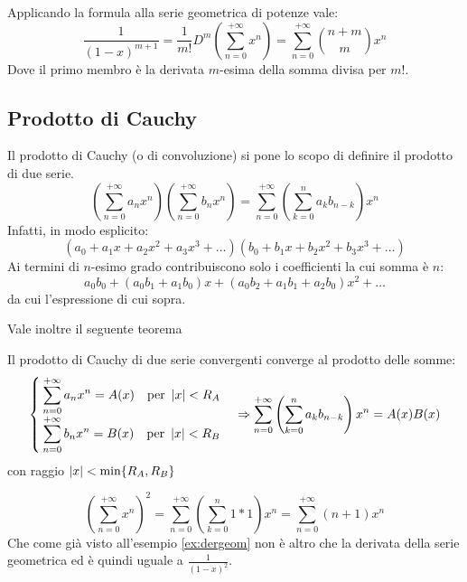 Applicando la formula alla serie geometrica di potenze vale:
\[
	\frac{1}{(1-x)^{m+1}}=\frac{1}{m!}D^m\left(\sum_{n=0}^{+\infty}x^n\right)=\sum_{n=0}^{+\infty}\binom{n+m}{m}x^n
\]
Dove il primo membro è la derivata $m$-esima della somma divisa per $m!$.


\subsection{Prodotto di Cauchy}
Il prodotto di Cauchy (o di convoluzione) si pone lo scopo di definire il prodotto di due serie.
\[
	\left(\sum_{n=0}^{+\infty} a_nx^n\right)\left(\sum_{n=0}^{+\infty}b_nx^n\right)=\sum_{n=0}^{+\infty}\left(\sum_{k=0}^na_kb_{n-k}\right)x^n
\]
Infatti, in modo esplicito:
\[
	(a_0+a_1x+a_2x^2+a_3x^3+\dots)(b_0+b_1x+b_2x^2+b_3x^3+\dots)
\]
Ai termini di $n$-esimo grado contribuiscono solo i coefficienti la cui somma è $n$:
\[
	a_0b_0+(a_0b_1+a_1b_0)x+(a_0b_2+a_1b_1+a_2b_0)x^2+\dots
\]
da cui l'espressione di cui sopra.

Vale inoltre il seguente teorema
\begin{teor}
	Il prodotto di Cauchy di due serie convergenti converge al prodotto delle somme:
	\[
		\begin{cases}
			\displaystyle\sum_{n=0}^{+\infty}a_nx^n=A(x)\quad\text{per }\left\lvert x \right\rvert<R_A \\[2ex]
			\displaystyle\sum_{n=0}^{+\infty}b_nx^n=B(x)\quad\text{per }\left\lvert x \right\rvert<R_B
		\end{cases}\Rightarrow
		\sum_{n=0}^{+\infty}\left(\sum_{k=0}^na_kb_{n-k}\right)x^n=A(x)B(x)
	\]
	con raggio $\left\lvert x \right\rvert<\text{min}\{R_A,R_B\}$
\end{teor}
\begin{examp}
	\[
		\left(\sum_{n=0}^{+\infty}x^n\right)^2=\sum_{n=0}^{+\infty}\left(\sum_{k=0}^n 1*1\right)x^n=\sum_{n=0}^{+\infty}(n+1)x^n
	\]
	Che come già visto all'esempio \ref{ex:dergeom} non è altro che la derivata della serie geometrica ed è quindi uguale a $\frac{1}{(1-x)^2}$.
\end{examp}

